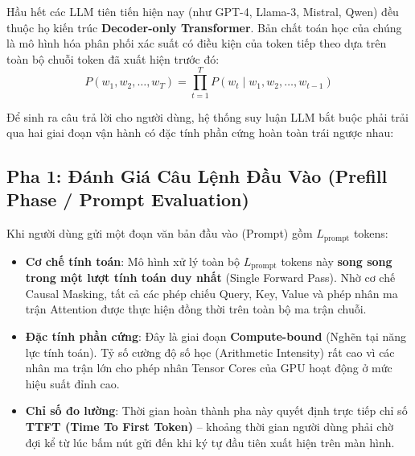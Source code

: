 Hầu hết các LLM tiên tiến hiện nay (như GPT-4, Llama-3, Mistral, Qwen) đều thuộc họ kiến trúc \textbf{Decoder-only Transformer}. Bản chất toán học của chúng là mô hình hóa phân phối xác suất có điều kiện của token tiếp theo dựa trên toàn bộ chuỗi token đã xuất hiện trước đó:
\begin{equation}
P(w_1, w_2, \dots, w_T) = \prod_{t=1}^T P(w_t \mid w_1, w_2, \dots, w_{t-1})
\end{equation}

Để sinh ra câu trả lời cho người dùng, hệ thống suy luận LLM bắt buộc phải trải qua hai giai đoạn vận hành có đặc tính phần cứng hoàn toàn trái ngược nhau:

\subsection{Pha 1: Đánh Giá Câu Lệnh Đầu Vào (Prefill Phase / Prompt Evaluation)}
Khi người dùng gửi một đoạn văn bản đầu vào (Prompt) gồm $L_{\text{prompt}}$ tokens:
\begin{itemize}
  \item \textbf{Cơ chế tính toán}: Mô hình xử lý toàn bộ $L_{\text{prompt}}$ tokens này \textbf{song song trong một lượt tính toán duy nhất} (Single Forward Pass). Nhờ cơ chế Causal Masking, tất cả các phép chiếu Query, Key, Value và phép nhân ma trận Attention được thực hiện đồng thời trên toàn bộ ma trận chuỗi.
  \item \textbf{Đặc tính phần cứng}: Đây là giai đoạn \textbf{Compute-bound} (Nghẽn tại năng lực tính toán). Tỷ số cường độ số học (Arithmetic Intensity) rất cao vì các nhân ma trận lớn cho phép nhân Tensor Cores của GPU hoạt động ở mức hiệu suất đỉnh cao.
  \item \textbf{Chỉ số đo lường}: Thời gian hoàn thành pha này quyết định trực tiếp chỉ số \textbf{TTFT (Time To First Token)} -- khoảng thời gian người dùng phải chờ đợi kể từ lúc bấm nút gửi đến khi ký tự đầu tiên xuất hiện trên màn hình.
\end{itemize}


